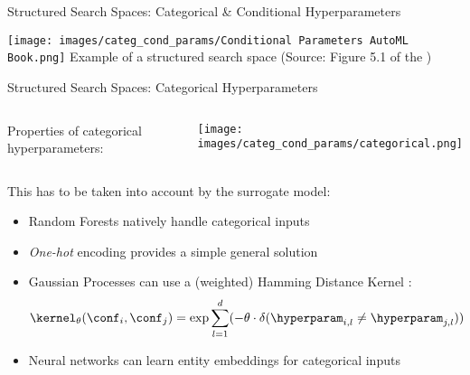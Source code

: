 \begin{frame}[c]{Structured Search Spaces: Categorical \&  Conditional Hyperparameters}
\begin{center}
    \texttt{[image: images/categ\_cond\_params/Conditional Parameters AutoML Book.png]}
    \newline
    Example of a structured search space (Source: Figure 5.1 of the )
\end{center}
\end{frame}
\begin{frame}[c]{Structured Search Spaces: Categorical Hyperparameters}

\begin{columns}[T]

\medskip
Properties of categorical hyperparameters:


\vspace{0.5cm}
\texttt{[image: images/categ\_cond\_params/categorical.png]}
%
\end{columns}

\pause
\vspace*{-0.4cm}
This has to be taken into account by the surrogate model:
%
\begin{itemize}
    \item Random Forests \alert{natively} handle categorical inputs 
    \item \emph{One-hot} encoding provides a simple general solution
    \item Gaussian Processes can use a (weighted) \alert{Hamming Distance Kernel} :
\vspace*{-0.2cm}
\begin{equation*}
    \kernel_{\theta}(\conf_i, \conf_j) = \exp{\sum_{l=1}^d (-\theta \cdot \delta(\hyperparam_{i,l} \neq \hyperparam_{j,l}))}
\end{equation*}

\vspace*{-0.2cm}
\item Neural networks can learn \alert{entity embeddings} for categorical inputs 
\end{itemize}
%
\end{frame}
